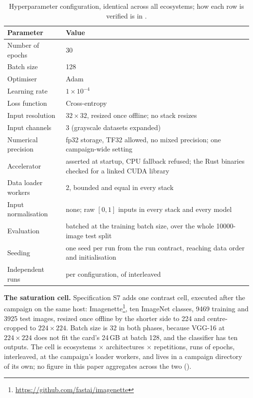 \begin{table}[t]
\centering
\caption{Hyperparameter configuration, identical across all ecosystems; how
each row is verified is in .}
\label{tab:hyperparams}

\begin{tabular}{@{}l p{}@{}}
\toprule
\textbf{Parameter} & \textbf{Value} \\
\midrule
Number of epochs      & 30 \\
Batch size            & 128 \\
Optimiser             & Adam \\
Learning rate         & $1 \times 10^{-4}$ \\
Loss function         & Cross-entropy \\
Input resolution      & $32 \times 32$, resized once offline; no stack resizes \\
Input channels        & 3 (grayscale datasets expanded) \\
Numerical precision   & fp32 storage, TF32 allowed, no mixed precision; one campaign-wide setting \\
Accelerator           & asserted at startup, CPU fallback refused; the Rust binaries checked for a linked CUDA library \\
Data loader workers   & 2, bounded and equal in every stack \\
Input normalisation   & none; raw $[0,1]$ inputs in every stack and every model \\
Evaluation            & batched at the training batch size, over the whole \num{10000}-image test split \\
Seeding               & one seed per run from the run contract, reaching data order and initialisation \\
Independent runs      & \vRepetitions{} per configuration, \vInterleavedRuns{} of \vRuns{} interleaved \\
\bottomrule
\end{tabular}
\end{table}

\textbf{The saturation cell.} Specification S7 adds one contrast cell, executed
after the campaign on the same host:
Imagenette\footnote{\url{https://github.com/fastai/imagenette}}, ten ImageNet
classes, \num{9469} training and \num{3925} test images, resized once offline by the
shorter side to 224 and centre-cropped to $224\times224$. Batch size is 32 in
both phases, because VGG-16 at $224\times224$ does not fit the card's 24\,GB at
batch 128, and the classifier has ten outputs. The cell is \vSatEcosystems{}
ecosystems $\times$ \vSatModels{} architectures $\times$ \vSatReps{}
repetitions, \vSatRuns{} runs of \vSatEpochs{} epochs, interleaved, at the
campaign's \vSatLoaderThreads{} loader workers, and lives in a campaign
directory of its own; no figure in this paper aggregates across the two
().

